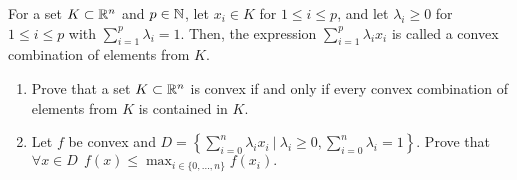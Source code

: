 \documentclass{ExerciseSheet}
\newif\ifsolutions
\begin{document}
\ifsolutions
\vskip 0.3cm

\begin{solution}
    $(\Rightarrow)$ Since $x^*$ is a stationary point of a convex constrained problem, we have
    \begin{align*}
        \nabla f(x^*)^T(x-x^*) \geq 0
    \end{align*}
    for all $x\in C$. Using the convexity of $f,$ it holds that
    \begin{align*}
        f(x)-f(x^*)\geq \nabla f(x^*)^T(x-x^*),
    \end{align*}
    and thus, $f(x)\geq f(x^*)$ for all $x \in C$.

    $(\Leftarrow)$ Since $x^*$ is a global minimum, it implies a stationary point by Theorem 1.3.
\end{solution}

\fi



\vskip 0.5cm

\begin{problem}

For a set $K\subset \mathbb{R}^n$ and $p\in \mathbb{N}$, let 
$x_i \in K$ for $1\leq i\leq p$, and let $\lambda_i \geq 0$ for $1\leq i\leq p$ with $ \displaystyle\sum_{i=1}^{p}{\lambda_i}=1$. Then, the expression $ \displaystyle\sum_{i=1}^{p}{\lambda_i x_i}$ is called a convex combination of elements from $K$. 

\begin{enumerate}
 \item Prove that a set $K \subset \mathbb{R}^n$ is convex if and only if every convex combination of elements from $K$ is contained in $K$.

 \item Let $f$ be convex and $D = \left\{\displaystyle\sum_{i=0}^{n}\lambda_ix_i ~|~ \lambda_i\geq0, \sum_{i=0}^{n}\lambda_i=1\right\}$. Prove that  $\forall x\in D ~~ f(x) \leq \displaystyle\max_{i\in\{0,\dots,n\}}f(x_i).$
 \end{enumerate}

\end{problem}

\ifsolutions
\vskip 0.3cm
\end{document}
